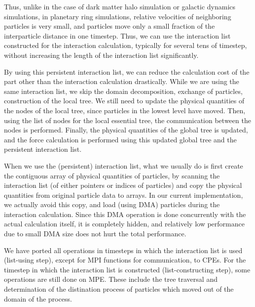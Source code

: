 \documentclass[sigconf]{acmart}
\begin{document}
Thus, unlike in the case of dark matter halo simulation or galactic
dynamics simulations, in planetary ring simulations, relative
velocities of neighboring particles is very small, and particles move
only a small fraction of the interparticle distance in one
timestep. Thus, we can use the interaction list constructed for the
interaction calculation, typically for several tens of timestep,
without increasing the length of the interaction list significantly. 

By using this persistent interaction list, we can reduce the
calculation cost of the part other than the interaction calculation
drastically. While we are using the same interaction list, we skip the
domain decomposition, exchange of particles, construction of the local
tree. We still need to update the physical quantities of the nodes of
the local tree, since particles in the lowest level have moved. Then,
using the list of nodes for the local essential tree, the
communication between the nodes is performed. Finally, the physical
quantities of the global tree is updated, and the force calculation is
performed using this updated global tree and the persistent
interaction list.

When we use the (persistent) interaction list, what we usually do is
first create the contiguous array of physical quantities of particles,
by scanning the interaction list (of either pointers or indices of
particles) and copy the physical quantities from original particle
data to arrays. In our current implementation, we actually avoid this
copy, and load (using DMA) particles during the interaction
calculation. Since this DMA operation is done concurrently with the
actual calculation itself, it is completely hidden, and relatively low
performance due to small DMA size does not hurt the total
performance. 

We have ported all operations in timesteps in which the interaction list
is used (list-using step), except for MPI functions for communication, to CPEs. For the
timestep in which the interaction list is constructed (list-constructing
step), some operations are still  done on MPE. These include the tree
traversal and determination of the distination process of particles
which moved out of the domain of the process.
\end{document}
